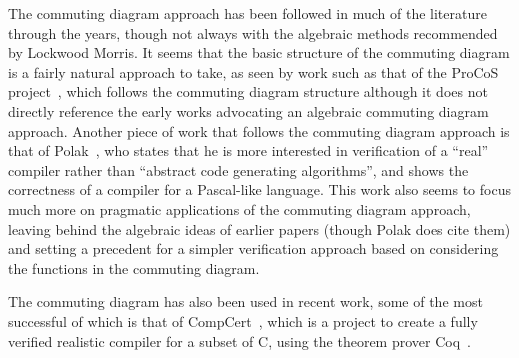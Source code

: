 \documentclass[a4paper,10pt]{article}
\begin{document}
The commuting diagram approach has been followed in much of the literature
through the years, though not always with the algebraic methods recommended by
Lockwood Morris.  It seems that the basic structure of the commuting diagram is
a fairly natural approach to take, as seen by work such as that of the ProCoS
project~\cite{buth1992}, which follows the commuting diagram structure although
it does not directly reference the early works advocating an algebraic commuting
diagram approach. Another piece of work that follows the commuting diagram
approach is that of Polak~\cite{polak1981}, who states that he is more
interested in verification of a ``real'' compiler rather than ``abstract code
generating algorithms'', and shows the correctness of a compiler for a
Pascal-like language.  This work also seems to focus much more on pragmatic
applications of the commuting diagram approach, leaving behind the algebraic
ideas of earlier papers (though Polak does cite them) and setting a precedent
for a simpler verification approach based on considering the functions in the
commuting diagram.

The commuting diagram has also been used in recent work, some of the most
successful of which is that of CompCert~\cite{leroy2009a, leroy2009b,
  leroy2012}, which is a project to create a fully verified realistic compiler
for a subset of C, using the theorem prover Coq~\cite{coq2004}.

\end{document}
